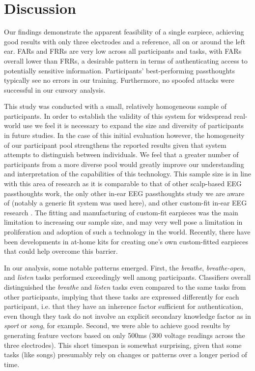 \documentclass{sigchi}
\begin{document}
\section{Discussion}

Our findings demonstrate the apparent feasibility of a single earpiece, achieving good results with only three electrodes and a reference, all on or around the left ear. FARs and FRRs are very low across all participants and tasks, with FARs overall lower than FRRs, a desirable pattern in terms of authenticating access to potentially sensitive information. Participants' best-performing passthoughts typically see no errors in our training. Furthermore, no spoofed attacks were successful in our cursory analysis.

This study was conducted with a small, relatively homogeneous sample of participants. In order to establish the validity of this system for widespread real-world use we feel it is necessary to expand the size and diversity of participants in future studies. In the case of this initial evaluation however, the homogeneity of our participant pool strengthens the reported results given that system attempts to distinguish between individuals. We feel that a greater number of  participants from a more diverse pool would greatly improve our understanding and interpretation of the capabilities of this technology. This sample size is in line with this area of research as it is comparable to that of other scalp-based EEG passthoughts work\cite{Ashby2011, Marcel2007a, Palaniappan2008, palaniappan2006electroencephalogram, Poulos2002, Chuang2013b}, the only other in-ear EEG passthoughts study we are aware of \cite{curran2016passthoughts} (notably a generic fit system was used here), and other custom-fit in-ear EEG research \cite{Kidmose2013a}. The fitting and manufacturing of custom-fit earpieces was the main limitation to increasing our sample size, and may very well pose a limitation in proliferation and adoption of such a technology in the world. Recently, there have been developments in at-home kits for creating one's own custom-fitted earpieces \cite{voix2015settable} that could help overcome this barrier.

In our analysis, some notable patterns emerged. First, the \textit{breathe},
\textit{breathe-open}, and \textit{listen} tasks performed exceedingly well among participants.
Classifiers overall distinguished the \textit{breathe}  and \textit{listen} tasks even compared
to the same tasks from other participants, implying that these tasks are expressed differently
for each participant, i.e. that they have an inherence factor sufficient for authentication,
even though they task do not involve an explicit secondary knowledge factor as in \textit{sport}
or \textit{song}, for example. Second, we were able to achieve good results by generating feature
vectors based on only 500ms (300 voltage readings across the three electrodes).
This short timespan is somewhat surprising, given that some tasks (like songs)
presumably rely on changes or patterns over a longer period of time.
\end{document}
